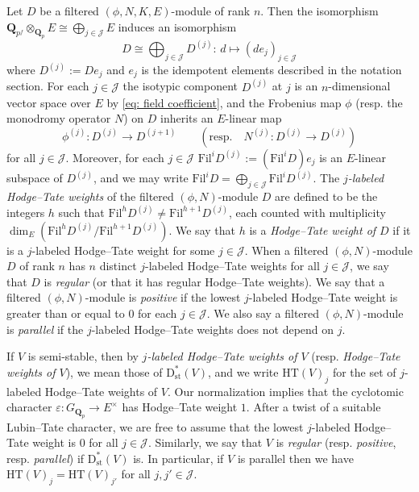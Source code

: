 \documentclass[11pt]{amsart}
\theoremstyle{definition}
\numberwithin{equation}{subsection}
\theoremstyle{plain}
\theoremstyle{plain}
\theoremstyle{plain}
\theoremstyle{plain}
\theoremstyle{plain}
\theoremstyle{plain}
\theoremstyle{plain}
\theoremstyle{plain}
\theoremstyle{plain}
\theoremstyle{plain}
\theoremstyle{plain}
\theoremstyle{plain}
\theoremstyle{definition}
\theoremstyle{definition}
\theoremstyle{definition}
\theoremstyle{remark}
\renewcommand{\(}{\textup{(}}
\renewcommand{\)}{\textup{)}}
\newcommand{\Q}{\mathbf{Q}}
\newcommand{\Fil}{\mathrm{Fil}}
\newcommand{\cJ}{\mathcal{J}}
\begin{document}
Let $D$ be a filtered $(\phi,N,K,E)$-module of rank $n$. Then the isomorphism $\Q_{p^f}\otimes_{\Q_p}E\cong \bigoplus_{j\in\cJ}E$ induces an isomorphism $$D\cong\bigoplus_{j\in\cJ}D^{(j)}:\, d\mapsto (de_j)_{j\in\cJ}$$ where $D^{(j)}:=De_j$ and $e_j$ is the idempotent elements described in the notation section. For each $j\in\cJ$ the isotypic component $D^{(j)}$ at $j$ is an $n$-dimensional vector space over $E$ by \eqref{eq: field coefficient}, and the Frobenius map $\phi$ (resp. the monodromy operator $N$) on $D$ inherits an $E$-linear map $$\phi^{(j)}:D^{(j)}\rightarrow D^{(j+1)}\qquad(\mbox{resp.}\quad N^{(j)}:D^{(j)}\rightarrow D^{(j)})$$ for all $j\in\cJ$. Moreover, for each $j\in\cJ$ $\Fil^iD^{(j)}:=(\Fil^iD)e_j$ is an $E$-linear subspace of $D^{(j)}$, and we may write $\Fil^iD=\bigoplus_{j\in\cJ}\Fil^iD^{(j)}$. The \emph{$j$-labeled Hodge--Tate weights} of the filtered $(\phi,N)$-module $D$ are defined to be the integers $h$ such that $\Fil^{h}D^{(j)} \neq \Fil^{h+1}D^{(j)}$, each counted with multiplicity $\dim_{E}(\Fil^{h}D^{(j)}/\Fil^{h+1}D^{(j)})$. We say that $h$ is a \emph{Hodge--Tate weight of $D$} if it is a $j$-labeled Hodge--Tate weight for some $j\in\cJ$. When a filtered $(\phi,N)$-module $D$ of rank $n$ has $n$ distinct $j$-labeled Hodge--Tate weights for all $j\in\cJ$, we say that $D$ is \emph{regular} (or that it has regular Hodge--Tate weights). We say that a filtered $(\phi,N)$-module is \emph{positive} if the lowest $j$-labeled Hodge--Tate weight is greater than or equal to $0$ for each $j\in\cJ$. We also say a filtered $(\phi,N)$-module is \emph{parallel} if the $j$-labeled Hodge--Tate weights does not depend on $j$.


If $V$ is semi-stable, then by \emph{$j$-labeled Hodge--Tate weights of $V$} (resp. \emph{Hodge--Tate weights of $V$}), we mean those of $\mathrm{D_{st}^{*}}(V)$, and we write $\mathrm{HT}(V)_j$ for the set of $j$-labeled Hodge--Tate weights of $V$.  Our normalization implies that the cyclotomic character $\varepsilon:G_{\Q_p}\rightarrow E^\times$ has Hodge–Tate weight $1$. After a twist of a suitable Lubin--Tate character, we are free to assume that the lowest $j$-labeled Hodge--Tate weight is $0$ for all $j\in\cJ$. Similarly, we say that $V$ is \emph{regular} (resp. \emph{positive}, resp. \emph{parallel}) if $\mathrm{D_{st}^{*}}(V)$ is. In particular, if $V$ is parallel then we have $\mathrm{HT}(V)_j=\mathrm{HT}(V)_{j'}$ for all $j,j'\in\cJ$.
\end{document}
